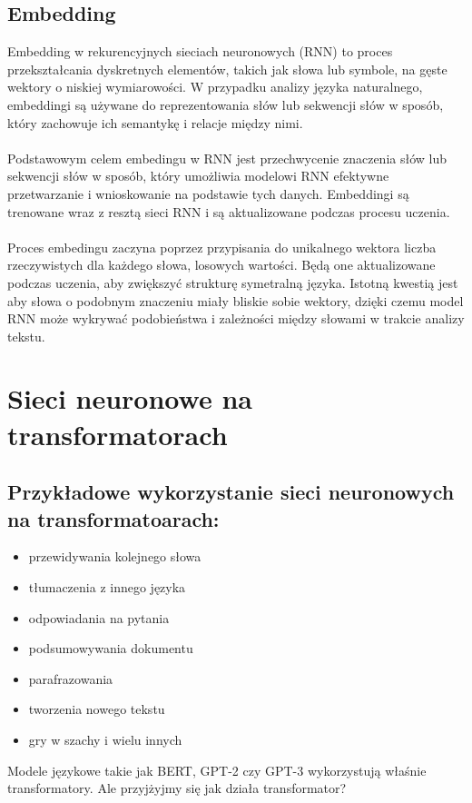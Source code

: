 \documentclass{article}
\begin{document}
    \subsection{Embedding}
    Embedding w rekurencyjnych sieciach neuronowych (RNN) to proces przekształcania dyskretnych elementów, takich jak słowa lub symbole, na gęste wektory o niskiej wymiarowości. W przypadku analizy języka naturalnego, embeddingi są używane do reprezentowania słów lub sekwencji słów w sposób, który zachowuje ich semantykę i relacje między nimi.\\\\
Podstawowym celem embedingu w RNN jest przechwycenie znaczenia słów lub sekwencji słów w sposób, który umożliwia modelowi RNN efektywne przetwarzanie i wnioskowanie na podstawie tych danych. Embeddingi są trenowane wraz z resztą sieci RNN i są aktualizowane podczas procesu uczenia. \\\\
Proces embedingu zaczyna poprzez przypisania do unikalnego wektora liczba rzeczywistych dla każdego słowa, losowych wartości. Będą one aktualizowane podczas uczenia, aby zwiększyć strukturę symetralną języka. Istotną kwestią jest aby słowa o podobnym znaczeniu miały bliskie sobie wektory, dzięki czemu model RNN może wykrywać podobieństwa i zależności między słowami w trakcie analizy tekstu.

\newpage
\section{Sieci neuronowe na transformatorach}
\subsection{Przykładowe wykorzystanie sieci neuronowych na transformatoarach:}
    \begin{itemize}
        \item przewidywania kolejnego słowa
        \item tłumaczenia z innego języka
        \item odpowiadania na pytania
        \item podsumowywania dokumentu
        \item parafrazowania
        \item tworzenia nowego tekstu
        \item gry w szachy
        i wielu innych 
    \end{itemize}
Modele językowe takie jak BERT, GPT-2 czy GPT-3 wykorzystują właśnie transformatory. Ale przyjżyjmy się jak działa transformator?
\end{document}
